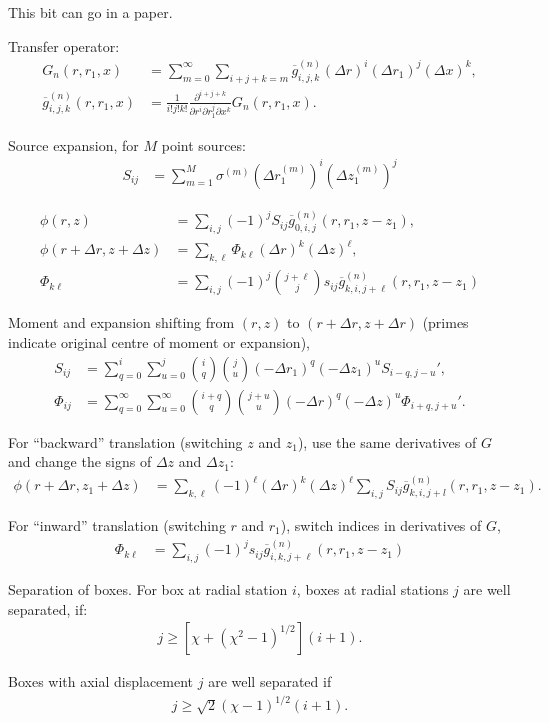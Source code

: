 \documentclass[a4paper,12pt]{article}
\newcommand{\gnbarijk}[4]{\overline{g}^{(#1)}_{#2,#3,#4}}
\begin{document}
This bit can go in a paper.

Transfer operator:
\begin{align}
  G_{n}(r,r_{1},x)
  &=
  \sum_{m=0}^{\infty}
  \sum_{i+j+k=m}
  \gnbarijk{n}{i}{j}{k}(\Delta r)^{i}(\Delta r_{1})^{j}(\Delta
  x)^{k},\\
  \gnbarijk{n}{i}{j}{k}(r,r_{1},x)
  &=
  \frac{1}{i!j!k!}
  \frac{\partial^{i+j+k}}
  {\partial r^{i}\partial r_{1}^{j}\partial x^{k}}
  G_{n}(r,r_{1},x).
\end{align}

Source expansion, for $M$ point sources:
\begin{align}
  S_{ij} &= \sum_{m=1}^{M}\sigma^{(m)}
  (\Delta r_{1}^{(m)})^{i}(\Delta z_{1}^{(m)})^{j}
\end{align}

\begin{align}
  \phi(r,z)
  &=
  \sum_{i,j} (-1)^{j}S_{ij}\gnbarijk{n}{0}{i}{j}(r,r_{1},z-z_{1}),\\
  \phi(r+\Delta r, z+\Delta z)
  &=
  \sum_{k,\ell}\Phi_{k\ell}
  (\Delta r)^{k}(\Delta z)^{\ell},\\
  \Phi_{k\ell}
  &=
  \sum_{i,j}
  (-1)^{j}
  \binom{j+\ell}{j}
  s_{ij}\gnbarijk{n}{k}{i}{j+\ell}(r,r_{1},z-z_{1})
\end{align}

Moment and expansion shifting from $(r,z)$ to $(r+\Delta r, z+\Delta
r)$ (primes indicate original centre of moment or expansion),
\begin{align}
  S_{ij}
  &=
  \sum_{q=0}^{i}
  \sum_{u=0}^{j}
  \binom{i}{q}
  \binom{j}{u}
  (-\Delta r_{1})^{q}
  (-\Delta z_{1})^{u}
  S_{i-q,j-u}',\\
  \Phi_{ij}
  &=
  \sum_{q=0}^{\infty}
  \sum_{u=0}^{\infty}
  \binom{i+q}{q}
  \binom{j+u}{u}
  (-\Delta r)^{q}
  (-\Delta z)^{u}
  \Phi_{i+q,j+u}'.  
\end{align}

For ``backward'' translation (switching $z$ and $z_{1}$), use the same
derivatives of $G$ and change the signs of $\Delta z$ and $\Delta
z_{1}$:
\begin{align}
  \phi(r+\Delta r, z_{1}+\Delta z)
  &=
  \sum_{k,\ell}
  (-1)^{\ell}
  (\Delta r)^{k}(\Delta z)^{\ell}
  \sum_{i,j}
  S_{ij}\gnbarijk{n}{k}{i}{j+l}(r,r_{1},z-z_{1}).  
\end{align}

For ``inward'' translation (switching $r$ and $r_{1}$), switch indices
in derivatives of $G$,
\begin{align}
  \Phi_{k\ell}
  &=
  \sum_{i,j}
  (-1)^{j}s_{ij}\gnbarijk{n}{i}{k}{j+\ell}(r,r_{1},z-z_{1})
\end{align}

Separation of boxes. For box at radial station $i$, boxes at radial
stations $j$ are well separated, if:
\begin{align*}
  j \geq \left[\chi + \left(\chi^{2}-1\right)^{1/2}\right](i+1).
\end{align*}

Boxes with axial displacement $j$ are well separated if
\begin{align*}
  j \geq \sqrt{2}\left(\chi-1\right)^{1/2}(i+1).
\end{align*}
\end{document}
